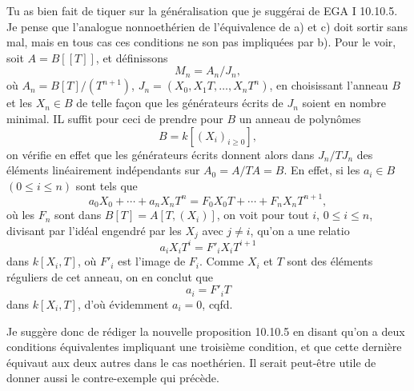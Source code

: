 \documentclass[11pt,a4paper]{article}
\begin{document}
Tu as bien fait de tiquer sur la généralisation que je suggérai de EGA I
10.10.5. Je pense que l'analogue nonnoethérien de l'équivalence de a) et c)
doit sortir sans mal, mais en tous cas ces conditions ne son pas impliquées
par b). Pour le voir, soit $A = B[[T]]$, et définissons
\[
M_n = A_n/J_n ,
\]
où $A_n = B[T]/(T^{n+1})$, $J_n = (X_0, X_1 T, \ldots, X_n T^n)$,
en choisissant l'anneau $B$ et les $X_n \in B$ de telle façon que les
générateurs écrits de $J_n$ soient en nombre minimal. IL suffit pour ceci de
prendre pour $B$ un anneau de polynômes
\[
B = k[(X_i)_{i \geq 0}] ,
\]
on vérifie en effet que les générateurs écrits donnent alors dans $J_n/TJ_n$
des éléments linéairement indépendants sur $A_0 = A/TA = B$. En effet, si les
$a_i \in B$ $(0 \leq i \leq n)$ sont tels que
\[
a_0 X_0 + \cdots + a_n X_n T^n = F_0 X_0 T + \cdots + F_n X_n T^{n+1} ,
\]
où les $F_n$ sont dans $B[T] = A[T,(X_i)]$, on voit pour tout $i$, $0 \leq i \leq n$,
divisant par l'idéal engendré par les $X_j$ avec $j \neq i$, qu'on a une
relatio
\[
a_i X_i T^i = F'_i X_i T^{i+1}
\]
dans $k[X_i, T]$,
où $F'_i$ est l'image de $F_i$. Comme $X_i$ et $T$ sont des éléments
réguliers de cet anneau, on en conclut que
\[
a_i = F'_i T
\]
dans $k[X_i, T]$,
d'où évidemment $a_i = 0$, cqfd.

Je suggère donc de rédiger la nouvelle proposition 10.10.5 en disant qu'on a
deux conditions équivalentes impliquant une troisième condition, et que cette
dernière équivaut aux deux autres dans le cas noethérien. Il serait peut-être
utile de donner aussi le contre-exemple qui précède.


\end{document}
